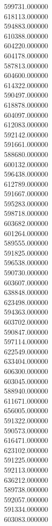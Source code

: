 599731.000000\\
618113.000000\\
594883.000000\\
610388.000000\\
604220.000000\\
604178.000000\\
587813.000000\\
604600.000000\\
614322.000000\\
590497.000000\\
618878.000000\\
604097.000000\\
612083.000000\\
592142.000000\\
591661.000000\\
588680.000000\\
600132.000000\\
596438.000000\\
612789.000000\\
591667.000000\\
595283.000000\\
598718.000000\\
603682.000000\\
601264.000000\\
589555.000000\\
591825.000000\\
596538.000000\\
590730.000000\\
603607.000000\\
638848.000000\\
623498.000000\\
594363.000000\\
603702.000000\\
590847.000000\\
597114.000000\\
622549.000000\\
633404.000000\\
606300.000000\\
603045.000000\\
588940.000000\\
611671.000000\\
656005.000000\\
591322.000000\\
590573.000000\\
616471.000000\\
623102.000000\\
591225.000000\\
592113.000000\\
636212.000000\\
589738.000000\\
592057.000000\\
591334.000000\\
603083.000000\\
